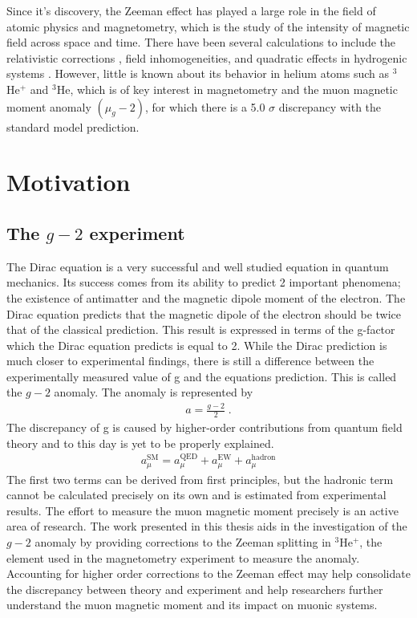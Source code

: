         Since it's discovery, the Zeeman effect has played a large role in the field of atomic physics and magnetometry, which is the study of the intensity of magnetic field across space and time. There have been several calculations to include the relativistic corrections \cite{2007Drake-Wu, Drake-Yan}, field inhomogeneities, and quadratic effects in hydrogenic systems \cite{Fontanari_Sadovskií_2015}. However, little is known about its behavior in helium atoms such as $^3$He$^+$ and $^3$He, which is of key interest in magnetometry and the muon magnetic moment anomaly $(\mu_g - 2)$, for which there is a 5.0 $\sigma$ discrepancy \cite{aguillard2023measurement} with the standard model prediction.

    \section{Motivation}\label{sec:motivation}
        \subsection{The $g-2$ experiment}\label{sec:g-2}
        The Dirac equation is a very successful and well studied equation in quantum mechanics. Its success comes from its ability to predict 2 important phenomena; the existence of antimatter and the magnetic dipole moment of the electron. The Dirac equation predicts that the magnetic dipole of the electron should be twice that of the classical prediction. This result is expressed in terms of the g-factor which the Dirac equation predicts is equal to 2. While the Dirac prediction is much closer to experimental findings, there is still a difference between the experimentally measured value of g and the equations prediction. This is called the $g-2$ anomaly. The anomaly is represented by
        \begin{align}
            a = \frac{g - 2}{2}\;.
        \end{align}
        \noindent The discrepancy of g is caused by higher-order contributions from quantum field theory and to this day is yet to be properly explained. 
        \begin{align}
            a^{\text{SM}}_\mu = a_\mu^{\text{QED}} + a_\mu^{\text{EW}} + a_\mu^{\text{hadron}}
        \end{align}
        \noindent The first two terms can be derived from first principles, but the hadronic term cannot be calculated precisely on its own and is estimated from experimental results. The effort to measure the muon magnetic moment precisely is an active area of research. The work presented in this thesis aids in the investigation of the $g-2$ anomaly by providing corrections to the Zeeman splitting in $^3$He$^+$, the element used in the magnetometry experiment to measure the anomaly. Accounting for higher order corrections to the Zeeman effect may help consolidate the discrepancy between theory and experiment and help researchers further understand the muon magnetic moment and its impact on muonic systems.

